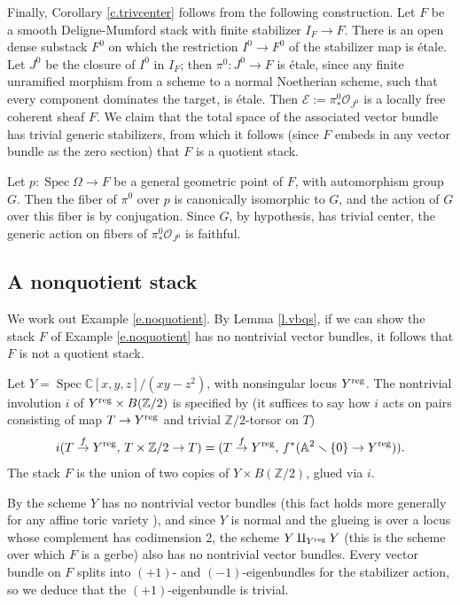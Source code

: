 \documentclass[12pt]{amsart}
\newcommand{\Z}{{\mathbb Z}}
\newcommand{\C}{{\mathbb C}}
\newcommand{\A}{{\mathbb A}}
\newcommand{\cO}{{\mathcal O}}
\newcommand{\cE}{{\mathcal E}}
\DeclareMathOperator{\spec}{Spec}
\theoremstyle{plain}
\theoremstyle{definition}
\theoremstyle{remark}
\begin{document}
Finally, Corollary \ref{c.trivcenter} follows from the following
construction.
Let $F$ be a smooth Deligne-Mumford stack with finite stabilizer
$I_F\to F$.
There is an open dense substack $F^0$ on which the restriction
$I^0\to F^0$ of the stabilizer map is \'etale.
Let $J^0$ be the closure of $I^0$ in $I_F$; then
$\pi^0\colon J^0\to F$ is \'etale,
since any finite unramified morphism from a scheme to a normal
Noetherian scheme, such that every component dominates the target,
is \'etale.
Then $\cE:=\pi^0_*\cO_{J^0}$ is a
locally free coherent sheaf $F$.
We claim that the total space of the associated vector bundle has
trivial generic stabilizers, from which it follows (since $F$ embeds
in any vector bundle as the zero section) that $F$ is
a quotient stack.

Let $p\colon \spec\Omega\to F$ be a general geometric point of $F$,
with automorphism group $G$.
Then the fiber of $\pi^0$ over $p$ is canonically isomorphic to $G$,
and the action of $G$ over this fiber is by conjugation.
Since $G$, by hypothesis, has trivial center, the generic action on fibers of
$\pi^0_*\cO_{J^0}$ is faithful.

\subsection{A nonquotient stack}  We work out
Example \ref{e.noquotient}.
By Lemma \ref{l.vbqs}, if we can show the stack $F$
of Example \ref{e.noquotient} has no nontrivial vector bundles,
it follows that $F$ is not a quotient stack.

Let $Y=\spec \C[x,y,z]/(xy-z^2)$, with nonsingular locus
$Y^{\rm reg}$.
The nontrivial involution $i$ of $Y^{\rm reg}\times B(\Z/2)$ is
specified by
(it suffices to say how $i$ acts on pairs consisting of map $T\to Y^{\rm reg}$
and trivial $\Z/2$-torsor on $T$)
$$i(T\stackrel{f}\rightarrow Y^{\rm reg},\, T\times\Z/2\rightarrow T)=
(T\stackrel{f}\rightarrow Y^{\rm reg},\, f^*(
\A^2\smallsetminus\{0\}\rightarrow Y^{\rm reg})).$$
The stack $F$ is the union of two copies of $Y \times B(\Z/2)$,
glued via $i$.

By \cite{M-P} the scheme $Y$ has no nontrivial vector bundles
(this fact holds more generally for any affine toric variety
\cite{Gu}),
and since $Y$ is normal and the glueing is over a locus whose
complement has codimension 2, the scheme $Y\amalg_{Y^{\rm reg}}Y$
(this is the scheme over which $F$ is a gerbe)
also has no nontrivial vector bundles.
Every vector bundle on $F$ splits into $(+1)$- and $(-1)$-eigenbundles
for the stabilizer action,
so we deduce that the $(+1)$-eigenbundle is trivial.
\end{document}
